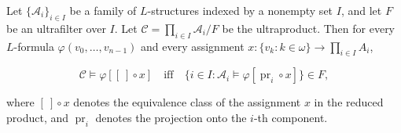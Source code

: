 Let $\{\mathcal{A}_i\}_{i \in I}$ be a family of $L$-structures indexed by a nonempty set $I$, and let $F$ be an ultrafilter over $I$. Let $\mathcal{C} = \prod_{i \in I} \mathcal{A}_i / F$ be the ultraproduct. Then for every $L$-formula $\varphi(v_0, \ldots, v_{n-1})$ and every assignment $x: \{v_k : k \in \omega\} \to \prod_{i \in I} A_i$,

$$\mathcal{C} \models \varphi[[\ ] \circ x] \quad \text{iff} \quad \{i \in I : \mathcal{A}_i \models \varphi[\operatorname{pr}_i \circ x]\} \in F,$$

where $[\ ] \circ x$ denotes the equivalence class of the assignment $x$ in the reduced product, and $\operatorname{pr}_i$ denotes the projection onto the $i$-th component.
